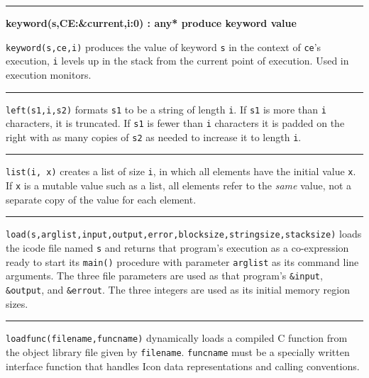 \bigskip\hrule\vspace{0.1cm}
\noindent
{\bf keyword(s,CE:\&current,i:0) : any* \hfill produce keyword value}

\noindent
{}\texttt{keyword(s,ce,i)} produces the value of keyword
\texttt{s} in the context of \texttt{ce}'s execution,
\texttt{i} levels up in the stack from the current point of execution.
Used in execution monitors.

\bigskip\hrule\vspace{0.1cm}

\noindent
{}\texttt{left(s1,i,s2)} formats \texttt{s1} to be a string
of length \texttt{i}. If \texttt{s1} is more than \texttt{i}
characters, it is truncated. If \texttt{s1} is fewer than \texttt{i}
characters it is padded on the right with as many copies of \texttt{s2}
as needed to increase it to length \texttt{i}.

\bigskip\hrule\vspace{0.1cm}

\noindent
{}\texttt{list(i, x)} creates a list of size \texttt{i},
in which all elements have the initial value \texttt{x}. If \texttt{x}
is a mutable value such as a list, all elements refer to the
\textit{same} value, not a separate copy of the value for each element.

\bigskip\hrule\vspace{0.1cm}

\noindent
{}
\texttt{load(s,arglist,input,output,error,blocksize,stringsize,stacksize)}
loads the icode file named \texttt{s} and returns that
program's execution as a co-expression ready to start
its \texttt{main()} procedure with parameter \texttt{arglist} as its
command line arguments. The three file parameters are used as that
program's \texttt{\&input}, \texttt{\&output}, and
\texttt{\&errout}. The three integers are used as its initial memory
region sizes.

\bigskip\hrule\vspace{0.1cm}

\noindent
{}\texttt{loadfunc(filename,funcname)} dynamically
loads a compiled C function from the object library file given by
\texttt{filename}. \texttt{funcname} must be a specially written
interface function that handles Icon data representations and calling
conventions.


